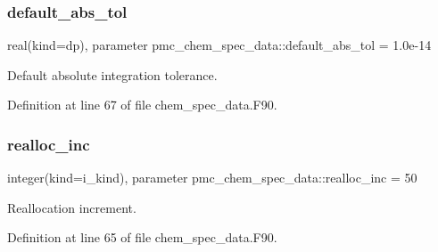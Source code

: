 \subsubsection{\texorpdfstring{default\+\_\+abs\+\_\+tol}{default\_abs\_tol}}
{\footnotesize\ttfamily real(kind=dp), parameter pmc\+\_\+chem\+\_\+spec\+\_\+data\+::default\+\_\+abs\+\_\+tol = 1.\+0e-\/14\hspace{0.3cm}{\ttfamily [private]}}



Default absolute integration tolerance. 



Definition at line 67 of file chem\+\_\+spec\+\_\+data.\+F90.

\mbox{\label{namespacepmc__chem__spec__data_a869f58a8ab2b2fa3818d101900a4a746}} 
\subsubsection{\texorpdfstring{realloc\+\_\+inc}{realloc\_inc}}
{\footnotesize\ttfamily integer(kind=i\+\_\+kind), parameter pmc\+\_\+chem\+\_\+spec\+\_\+data\+::realloc\+\_\+inc = 50\hspace{0.3cm}{\ttfamily [private]}}



Reallocation increment. 



Definition at line 65 of file chem\+\_\+spec\+\_\+data.\+F90.

